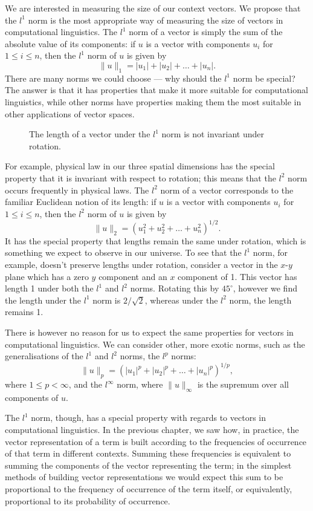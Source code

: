\documentclass[11pt]{report}
\begin{document}
We are interested in measuring the size of our context vectors. We propose that the $l^1$ norm is the most appropriate way of measuring the size of vectors in computational linguistics. The $l^1$ norm of a vector is simply the sum of the absolute value of its components:  if $u$ is a vector with components $u_i$ for $1 \le i \le n$, then the $l^1$ norm of $u$ is given by
$$\|u\|_1 = |u_1| + |u_2| +\ldots + |u_n|.$$
 There are many norms we could choose --- why should the $l^1$ norm be special? The answer is that it has properties that make it more suitable for computational linguistics, while other norms have properties making them the most suitable in other applications of vector spaces.
 
\begin{figure}
\begin{center}
\subfigure{}
\subfigure{}
\caption{The length of a vector under the $l^1$ norm is not invariant under rotation.}
\end{center}
\end{figure}

For example, physical law in our three spatial dimensions has the special property that it is invariant with respect to rotation; this means that the $l^2$ norm occurs frequently in physical laws. The $l^2$ norm of a vector corresponds to the familiar Euclidean notion of its length: if $u$ is a vector with components $u_i$ for $1 \le i \le n$, then the $l^2$ norm of $u$ is given by
$$\|u\|_2 = (u_1^2 + u_2^2 +\ldots + u_n^2)^{1/2}.$$
It has the special property that lengths remain the same under rotation, which is something we expect to observe in our universe. 
To see that the $l^1$ norm, for example, doesn't preserve lengths under rotation, consider a vector in the $x$-$y$ plane which has a zero $y$ component and an $x$ component of 1. This vector has length 1 under both the $l^1$ and $l^2$ norms. Rotating this by $45^\circ$, however we find the length under the $l^1$ norm is $2/\sqrt{2}$, whereas under the $l^2$ norm, the length remains 1.

There is however no reason for us to expect the same properties for vectors in computational linguistics. We can consider other, more exotic norms, such as the generalisations of the $l^1$ and $l^2$ norms, the $l^p$ norms:
$$\|u\|_p = (|u_1|^p + |u_2|^p +\ldots + |u_n|^p)^{1/p},$$
where $1 \le p < \infty$, and the $l^\infty$ norm, where $\|u\|_\infty$ is the supremum over all components of $u$.

The $l^1$ norm, though, has a special property with regards to vectors in computational linguistics. In the previous chapter, we saw  how, in practice, the vector representation of a term is built according to the frequencies of occurrence of that term in different contexts. Summing these frequencies is equivalent to summing the components of the vector representing the term; in the simplest methods of building vector representations we would expect this sum to be proportional to the frequency of occurrence of the term itself, or equivalently, proportional to its probability of occurrence.
\end{document}

